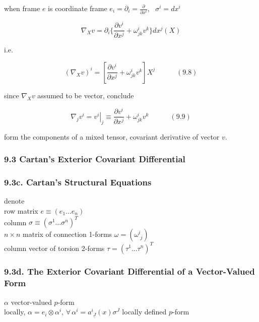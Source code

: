 when frame $e$ is coordinate frame $e_i = \partial_i = \frac{ \partial }{ \partial x^i}$, \, $\sigma^i = dx^i$

\[
\nabla_X v = \partial_i \lbrace \frac{ \partial v^i}{ \partial x^j} + \omega^i_{jk} v^k \rbrace dx^j(X)
\]

i.e. 

\begin{equation}
        (\nabla_X v)^i = \left[ \frac{ \partial v^i}{ \partial x^j} + \omega^i_{jk} v^k \right] X^j \quad \quad \quad (9.8)
\end{equation}


since $\nabla_X v$ assumed to be vector, conclude

\begin{equation}
        \nabla_j v^i = \left. v^i \right|_j \equiv \frac{ \partial v^i}{ \partial x^j} + \omega^i_{jk} v^k \quad \quad \quad (9.9)
\end{equation}

form the components of a mixed tensor, covariant derivative of vector $v$.  




\subsubsection{9.3 Cartan's Exterior Covariant Differential}

\subsubsection{9.3c. Cartan's Structural Equations}


denote \\
row matrix  $ e \equiv (e_1 \dots e_n) $ \\
column $\sigma \equiv (\sigma^1 \dots \sigma^n )^T$ \\

$n \times n$ matrix of connection 1-forms $\omega = (\omega^i_{ \, \, j} )$ \\

column vector of torsion 2-forms $\tau = (\tau^1 \dots \tau^n)^T$


\subsubsection{9.3d. The Exterior Covariant Differential of a Vector-Valued Form}

$\alpha$ vector-valued $p$-form \\
locally,
$\alpha = e_i \otimes \alpha^i$, $\forall \, \alpha^i = a^i_{\, \, \underline{J}}(x) \sigma^J$ locally defined $p$-form \\

